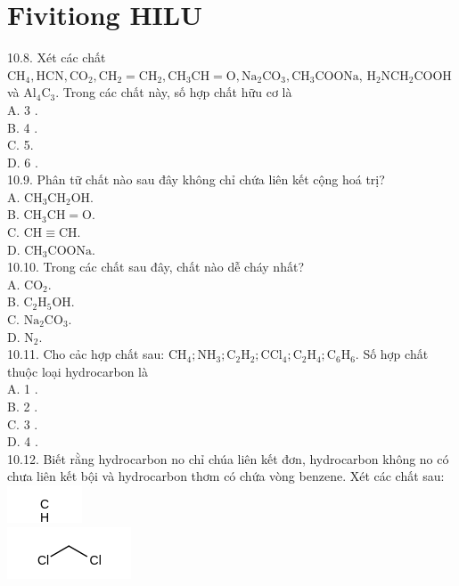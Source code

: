 \documentclass[10pt]{article}
\begin{document}
\section*{Fivitiong HILU}
10.8. Xét các chất $\mathrm{CH}_{4}, \mathrm{HCN}, \mathrm{CO}_{2}, \mathrm{CH}_{2}=\mathrm{CH}_{2}, \mathrm{CH}_{3} \mathrm{CH}=\mathrm{O}, \mathrm{Na}_{2} \mathrm{CO}_{3}, \mathrm{CH}_{3} \mathrm{COONa}$, $\mathrm{H}_{2} \mathrm{NCH}_{2} \mathrm{COOH}$ và $\mathrm{Al}_{4} \mathrm{C}_{3}$. Trong các chất này, số hợp chất hữu cơ là\\
A. 3 .\\
B. 4 .\\
C. 5.\\
D. 6 .\\
10.9. Phân tữ chất nào sau đây không chỉ chứa liên kết cộng hoá trị?\\
A. $\mathrm{CH}_{3} \mathrm{CH}_{2} \mathrm{OH}$.\\
B. $\mathrm{CH}_{3} \mathrm{CH}=\mathrm{O}$.\\
C. $\mathrm{CH} \equiv \mathrm{CH}$.\\
D. $\mathrm{CH}_{3} \mathrm{COONa}$.\\
10.10. Trong các chất sau đây, chất nào dễ cháy nhất?\\
A. $\mathrm{CO}_{2}$.\\
B. $\mathrm{C}_{2} \mathrm{H}_{5} \mathrm{OH}$.\\
C. $\mathrm{Na}_{2} \mathrm{CO}_{3}$.\\
D. $\mathrm{N}_{2}$.\\
10.11. Cho cảc hợp chất sau: $\mathrm{CH}_{4} ; \mathrm{NH}_{3} ; \mathrm{C}_{2} \mathrm{H}_{2} ; \mathrm{CCl}_{4} ; \mathrm{C}_{2} \mathrm{H}_{4} ; \mathrm{C}_{6} \mathrm{H}_{6}$. Số hợp chất thuộc loại hydrocarbon là\\
A. 1 .\\
B. 2 .\\
C. 3 .\\
D. 4 .\\
10.12. Biết rằng hydrocarbon no chỉ chúa liên kết đơn, hydrocarbon không no có chưa liên kết bội và hydrocarbon thơm có chứa vòng benzene. Xét các chất sau:\\
\includegraphics{smile-1705ef711880c333f350adac6534233da891a6d5}\\
\includegraphics{smile-f9d0a229f3259a7f8f713a40058d6fc8510976a7}\\
\end{document}
